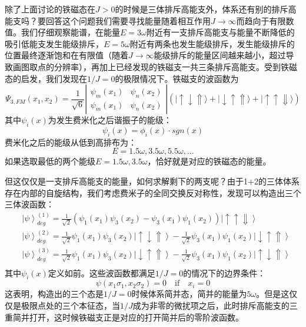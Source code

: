 除了上面讨论的铁磁态在$J>0$的时候是三体排斥高能支外，体系还有别的排斥高能支吗？要回答这个问题我们需要寻找能量随着相互作用$J\to\infty$而趋向于有限数值。我们仔细观察能谱，在能量$E=3\omega$附近有一支排斥高能支与能量不断降低的吸引低能支发生能级排斥，$E=5\omega$附近有两条也发生能级排斥，发生能级排斥的位置最终逐渐饱和在有限值（随着$J\to\infty$能级排斥的能量区间越来越小，超过导致画图取点的分辨率），再加上已经发现的铁磁支一共三条排斥高能支。受到铁磁态的启发，我们发现在$1/J=0$的极限情况下。铁磁支的波函数为
\begin{equation}
\Psi_{3,FM}(x_1,x_2)=\frac{1}{\sqrt{6}}\left|\begin{array}{cc}\psi_m(x_1) & \psi_n(x_2) \\\psi_m(x_1) & \psi_n(x_2)\end{array}\right| \left(|\uparrow\downarrow\Uparrow\rangle+|\downarrow\uparrow\Uparrow\rangle+|\uparrow\uparrow\Downarrow\rangle\right)
\end{equation}
其中$\psi_i(x)$为发生费米化之后谐振子的能级：
\begin{equation}
\psi_i(x) = \phi_{i}(x) \cdot sgn(x) 
\end{equation}
费米化之后的能级从低到高排布为：
\begin{equation}
E = 1.5\omega, 3.5\omega, 5.5\omega, ...
\end{equation}
如果选取最低的两个能级$E=1.5\omega, 3.5\omega$，恰好就是对应的铁磁态的能量。

但这仅仅是一支排斥高能支的能量，如何求解剩下的两支呢？由于1+2的三体体系存在内部的自旋结构，我们考虑费米子的全同交换反对称性，发现可以构造出三个三体波函数：
\begin{equation}
    \begin{split}
        &\left|\psi\right>^{(1)}_{deg} =  \frac{1}{\sqrt{2}} (\psi_1(x_1)\psi_3(x_2)- \psi_3(x_1)\psi_1(x_2)) \left|\uparrow \uparrow \Downarrow \right>\\
        &\left|\psi\right>^{(2)}_{deg} = \frac{1}{\sqrt{2}}\psi_1(x_1)\psi_3(x_2)\left|\uparrow \downarrow \Uparrow \right> - \frac{1}{\sqrt{2}}\psi_3(x_1)\psi_1(x_2)\left|\downarrow \uparrow \Uparrow \right>\\
        &\left|\psi\right>^{(3)}_{deg} = \frac{1}{\sqrt{2}}\psi_1(x_1)\psi_3(x_2)\left|\downarrow \uparrow \Uparrow \right> - \frac{1}{\sqrt{2}}\psi_3(x_1)\psi_1(x_2)\left|\uparrow \downarrow \Uparrow \right>\\
    \end{split}
\end{equation}
其中$\psi_i(x)$定义如前。这些波函数都满足$1/J=0$的情况下的边界条件：
\begin{equation}
    \psi(x_1\sigma_1,x_2\sigma_2) = 0 \quad \text{if} \quad x_i =0
\end{equation}
这表明，构造出的三个态是$1/J=0$时候体系简并态，简并的能量为$5\omega$。但是这仅仅是极限点处的三个本征态，当$1/J$成为非零的微扰项之后，此时排斥高能支的三重简并打开，这时候铁磁支正是对应的打开简并后的零阶波函数。

